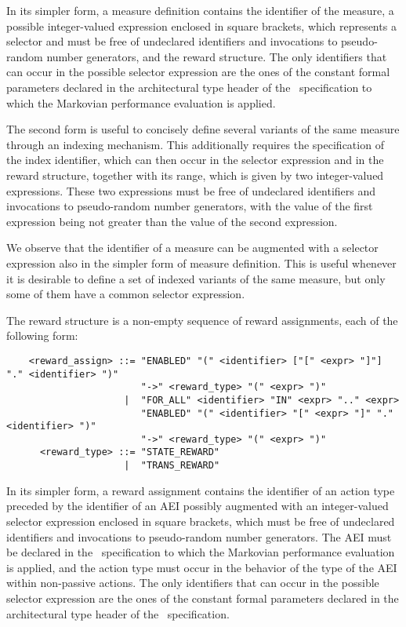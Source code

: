 In its simpler form, a measure definition contains the identifier of the measure, a possible
integer-valued expression enclosed in square brackets, which represents a selector and must be free of
undeclared identifiers and invocations to pseudo-random number generators, and the reward structure. The
only identifiers that can occur in the possible selector expression are the ones of the constant formal
parameters declared in the architectural type header of the \aemilia\ specification to which the Markovian
performance evaluation is applied.

The second form is useful to concisely define several variants of the same measure through an indexing
mechanism. This additionally requires the specification of the index identifier, which can then occur in the
selector expression and in the reward structure, together with its range, which is given by two
integer-valued expressions. These two expressions must be free of undeclared identifiers and invocations to
pseudo-random number generators, with the value of the first expression being not greater than the value of
the second expression.

We observe that the identifier of a measure can be augmented with a selector expression also in the simpler
form of measure definition. This is useful whenever it is desirable to define a set of indexed variants of
the same measure, but only some of them have a common selector expression.

The reward structure is a non-empty sequence of reward assignments, each of the following form:

        \begin{verbatim}
    <reward_assign> ::= "ENABLED" "(" <identifier> ["[" <expr> "]"] "." <identifier> ")"
                        "->" <reward_type> "(" <expr> ")"
                     |  "FOR_ALL" <identifier> "IN" <expr> ".." <expr>
                        "ENABLED" "(" <identifier> "[" <expr> "]" "." <identifier> ")"
                        "->" <reward_type> "(" <expr> ")"
      <reward_type> ::= "STATE_REWARD"
                     |  "TRANS_REWARD"
        \end{verbatim}

In its simpler form, a reward assignment contains the identifier of an action type preceded by the
identifier of an AEI possibly augmented with an integer-valued selector expression enclosed in square
brackets, which must be free of undeclared identifiers and invocations to pseudo-random number generators.
The AEI must be declared in the \aemilia\ specification to which the Markovian performance evaluation is
applied, and the action type must occur in the behavior of the type of the AEI within non-passive actions.
The only identifiers that can occur in the possible selector expression are the ones of the constant formal
parameters declared in the architectural type header of the \aemilia\ specification.

